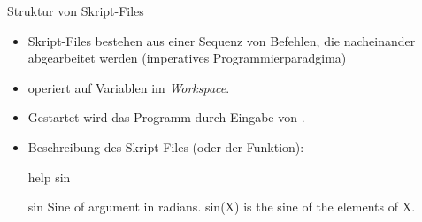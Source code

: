 \documentclass[hyperref={xetex}]{beamer}
\begin{document}

%





\begin{frame}[fragile]{Struktur von Skript-Files}
\begin{itemize}
\item Skript-Files bestehen aus einer Sequenz von Befehlen, die
  nacheinander abgearbeitet werden (imperatives Programmierparadgima)

\item operiert auf Variablen im \textit{Workspace}.

\item Gestartet wird das Programm  durch Eingabe von
  .

\item Beschreibung des Skript-Files (oder der Funktion):
\begin{matlabin}
help sin
\end{matlabin}
\begin{matlab}
   sin    Sine of argument in radians.
      sin(X) is the sine of the elements of X.
\end{matlab}


\end{itemize}
\end{frame}
\end{document}
